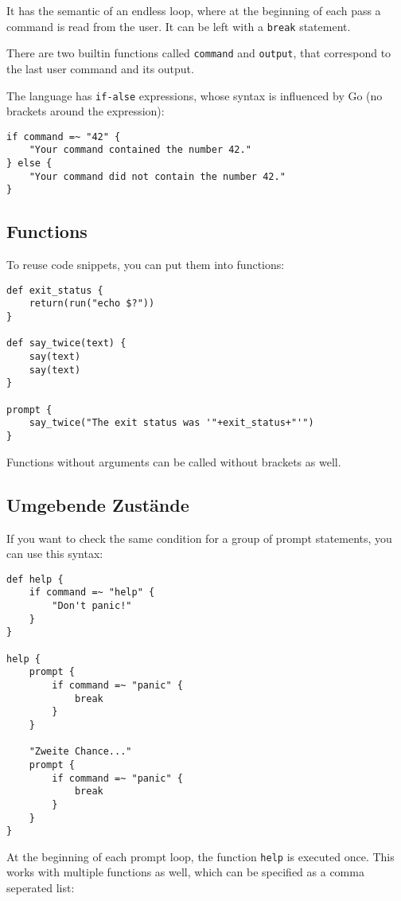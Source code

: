 \documentclass[twoside]{scrreprt}
\begin{document}
It has the semantic of an endless loop, where at the beginning of each pass a command is read from the user. It can be left with a \texttt{break} statement.

There are two builtin functions called \texttt{command} and \texttt{output}, that correspond to the last user command and its output.

The language has \texttt{if-alse} expressions, whose syntax is influenced by Go (no brackets around the expression):

\begin{lstlisting}
if command =~ "42" {
    "Your command contained the number 42."
} else {
    "Your command did not contain the number 42."
}
\end{lstlisting}

\subsection{Functions}

To reuse code snippets, you can put them into functions:

\begin{lstlisting}
def exit_status {
    return(run("echo $?"))
}

def say_twice(text) {
    say(text)
    say(text)
}

prompt {
    say_twice("The exit status was '"+exit_status+"'")
}
\end{lstlisting}

Functions without arguments can be called without brackets as well.

\subsection{Umgebende Zustände}

If you want to check the same condition for a group of prompt statements, you can use this syntax:

\begin{lstlisting}
def help {
    if command =~ "help" {
        "Don't panic!"
    }
}

help {
    prompt {
        if command =~ "panic" {
            break
        }
    }

    "Zweite Chance..."
    prompt {
        if command =~ "panic" {
            break
        }
    }
}
\end{lstlisting}

At the beginning of each prompt loop, the function \texttt{help} is executed once. This works with multiple functions as well, which can be specified as a comma seperated list:
\end{document}
